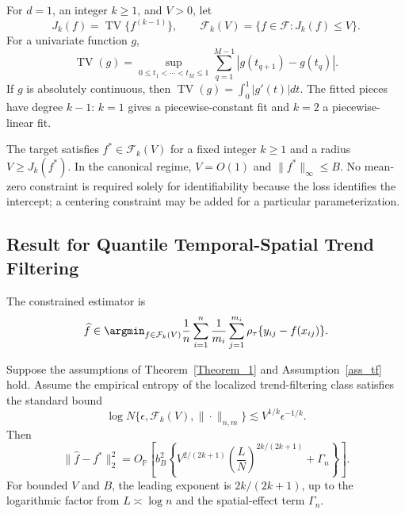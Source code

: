 \documentclass[twoside,11pt]{article}
\newenvironment{revision}{\color{revisionred}}{}
\begin{document}
\begin{definition}\label{def_tf}
\begin{revision}
For $d=1$, an integer $k\ge1$, and $V>0$, let
\begin{equation}
 J_k(f)=\operatorname{TV}\{f^{(k-1)}\},\qquad
 \mathcal F_k(V)=\{f\in\mathcal F:J_k(f)\le V\}.              \label{def_tvspace_tf}
\end{equation}
For a univariate function $g$,
\[
 \operatorname{TV}(g)=\sup_{0\le t_1<\cdots<t_M\le1}
 \sum_{q=1}^{M-1}|g(t_{q+1})-g(t_q)|.
\]
If $g$ is absolutely continuous, then $\operatorname{TV}(g)=\int_0^1|g'(t)|dt$. The fitted pieces have degree $k-1$: $k=1$ gives a piecewise-constant fit and $k=2$ a piecewise-linear fit.
\end{revision}
\end{definition}

\begin{assumption}\label{ass_tf}
\begin{revision}
The target satisfies $f^*\in\mathcal F_k(V)$ for a fixed integer $k\ge1$ and a radius $V\ge J_k(f^*)$. In the canonical regime, $V=O(1)$ and $\|f^*\|_\infty\le B$. No mean-zero constraint is required solely for identifiability because the loss identifies the intercept; a centering constraint may be added for a particular parameterization.
\end{revision}
\end{assumption}

\subsection{Result for Quantile Temporal-Spatial Trend Filtering}
\begin{revision}
The constrained estimator is
\begin{equation}
 \widehat f\in\argmin_{f\in\mathcal F_k(V)}
 \frac1n\sum_{i=1}^n\frac1{m_i}\sum_{j=1}^{m_i}
 \rho_\tau\{y_{ij}-f(x_{ij})\}.                              \label{eq172}
\end{equation}
\end{revision}

\begin{theorem}\label{Theorem_2}
\begin{revision}
Suppose the assumptions of Theorem~\ref{Theorem_1} and Assumption~\ref{ass_tf} hold. Assume the empirical entropy of the localized trend-filtering class satisfies the standard bound
\[
 \log N\{\epsilon,\mathcal F_k(V),\|\cdot\|_{n,m}\}
 \lesssim V^{1/k}\epsilon^{-1/k}.
\]
Then
\begin{equation}
 \|\widehat f-f^*\|_2^2
 =O_{\mathbb P}\left[
 b_B^2\left\{V^{2/(2k+1)}\left(\frac{L}{N}\right)^{2k/(2k+1)}
 +\Gamma_n\right\}\right].                                  \label{tf_rate}
\end{equation}
For bounded $V$ and $B$, the leading exponent is $2k/(2k+1)$, up to the logarithmic factor from $L\asymp\log n$ and the spatial-effect term $\Gamma_n$.
\end{revision}
\end{theorem}
\end{document}
